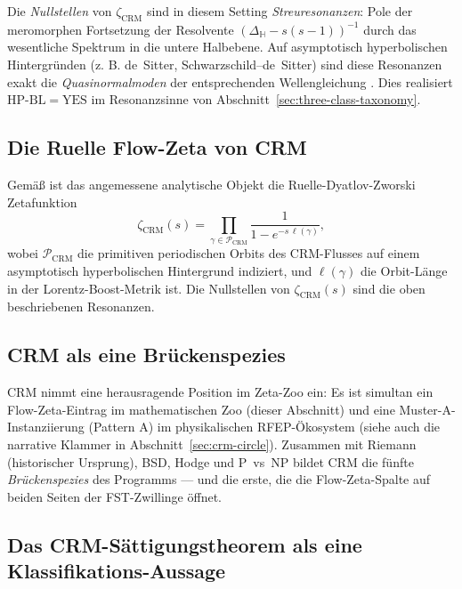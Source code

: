 \documentclass[11pt]{article}
\theoremstyle{definition}
\theoremstyle{remark}
\newcommand{\HBL}{\mathrm{HP\text{-}BL}}
\begin{document}
Die \emph{Nullstellen} von $\zeta_{\mathrm{CRM}}$ sind in diesem Setting
\emph{Streuresonanzen}: Pole der meromorphen Fortsetzung
der Resolvente $(\Delta_{\mathbb{H}} - s(s-1))^{-1}$ durch das
wesentliche Spektrum in die untere Halbebene. Auf asymptotisch
hyperbolischen Hintergründen (z. B. de~Sitter, Schwarzschild--de~Sitter)
sind diese Resonanzen exakt die \emph{Quasinormalmoden} der
entsprechenden Wellengleichung \cite{DyatlovZworski2019}. Dies realisiert
$\HBL = \mathrm{YES}$ im Resonanzsinne von
Abschnitt~\ref{sec:three-class-taxonomy}.

\subsection{Die Ruelle Flow-Zeta von CRM}

Gemäß \cite{DyatlovZworski2019} ist das angemessene analytische Objekt
die Ruelle-Dyatlov-Zworski Zetafunktion
\begin{equation}
\label{eq:crm-flow-zeta}
  \zeta_{\mathrm{CRM}}(s)
  = \prod_{\gamma \in \mathcal{P}_{\mathrm{CRM}}}
    \frac{1}{1 - e^{-s\,\ell(\gamma)}},
\end{equation}
wobei $\mathcal{P}_{\mathrm{CRM}}$ die primitiven periodischen
Orbits des CRM-Flusses auf einem asymptotisch hyperbolischen Hintergrund indiziert,
und $\ell(\gamma)$ die Orbit-Länge in der Lorentz-Boost-Metrik ist.
Die Nullstellen von $\zeta_{\mathrm{CRM}}(s)$ sind die oben beschriebenen
Resonanzen.

\subsection{CRM als eine Brückenspezies}

CRM nimmt eine herausragende Position im Zeta-Zoo ein: Es
ist simultan ein Flow-Zeta-Eintrag im mathematischen Zoo (dieser
Abschnitt) und eine Muster-A-Instanziierung (Pattern A) im physikalischen RFEP-Ökosystem
\cite{RFEPFramework} (siehe auch die narrative Klammer in
Abschnitt~\ref{sec:crm-circle}). Zusammen mit Riemann (historischer
Ursprung), BSD, Hodge und P~vs~NP bildet CRM die fünfte
\emph{Brückenspezies} des Programms --- und die erste, die die
Flow-Zeta-Spalte auf beiden Seiten der FST-Zwillinge öffnet.

\subsection{Das CRM-Sättigungstheorem als eine Klassifikations-Aussage}
\label{sec:crm-saturation-classification}
\end{document}
